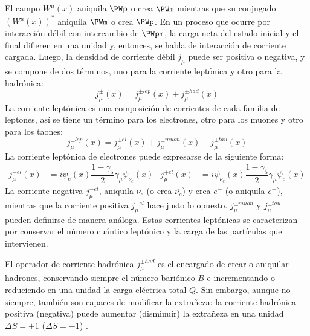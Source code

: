 El campo $W^{\mu}(x)$ aniquila $\PWp$ o crea $\PWm$ mientras que su conjugado $\left(W^{\mu}(x)\right)^\ast$ aniquila $\PWm$ o crea $\PWp$. En un proceso que ocurre por interacción débil con intercambio de $\PWpm$, la carga neta del estado inicial y el final difieren en una unidad y, entonces, se habla de interacción de corriente cargada. Luego, la densidad de corriente débil $j_{\mu}$ puede ser positiva o negativa, y se compone de dos términos, uno para la corriente leptónica y otro para la hadrónica:
\begin{equation}
j_{\mu} ^{\pm }\left( x\right) =j_{\mu} ^{\pm lep}\left( x\right) +j_{\mu} ^{\pm had}\left( x\right) \label{eq:weak_current_hadylep}
\end{equation}
La corriente leptónica es una composición de corrientes de cada familia de leptones, así se tiene un término para los electrones, otro para los muones y otro para los taones:
\begin{equation}
j_{\mu }^{\pm lep}\left( x\right) =j_{\mu }^{\pm el}\left( x\right) +j_{\mu }^{\pm muon}\left( x\right) +j_{\mu} ^{\pm tau}\left( x\right)\label{eq:leptonic_weak_current}
\end{equation}
La corriente leptónica de electrones puede expresarse de la siguiente forma:
\begin{align}
j_{\mu }^{-el}\left(x\right)&=i\overline{\psi}_{e}\left( x\right) \dfrac{1-\gamma_{5}}{2}\gamma _{\mu }\psi_{{ \nu}_{e}}\left( x\right) & j_{\mu}^{+el}\left(x\right)&= i\overline{\psi}_{{\nu}_{e}}\left(x\right) \dfrac{1-\gamma_{5}}{2}\gamma _{\mu}\psi_{e}\left( x\right)\label{eq:electric_weak_current}
\end{align}
La corriente negativa $j_{\mu }^{-el}$, aniquila $\nu_e$ (o crea $\overline{\nu_e}$) y crea $e^-$ (o aniquila $e^+$), mientras que la corriente positiva $j_{\mu }^{+el}$ hace justo lo opuesto. $j_{\mu }^{\pm muon}$ y $j_{\mu }^{\pm tau}$ pueden definirse de manera análoga. Estas corrientes leptónicas se caracterizan por conservar el número cuántico leptónico y la carga de las partículas que intervienen. 

El operador de corriente hadrónica $j_{\mu} ^{\pm had}$ es el encargado de crear o aniquilar hadrones, conservando siempre el número bariónico $B$ e incrementando o reduciendo en una unidad la carga eléctrica total $Q$. Sin embargo, aunque no siempre, también son capaces de modificar la extrañeza: la corriente hadrónica positiva (negativa) puede aumentar (disminuir) la extrañeza en una unidad $\Delta S = +1$ ($\Delta S = -1$) \cite{notas2020}.

